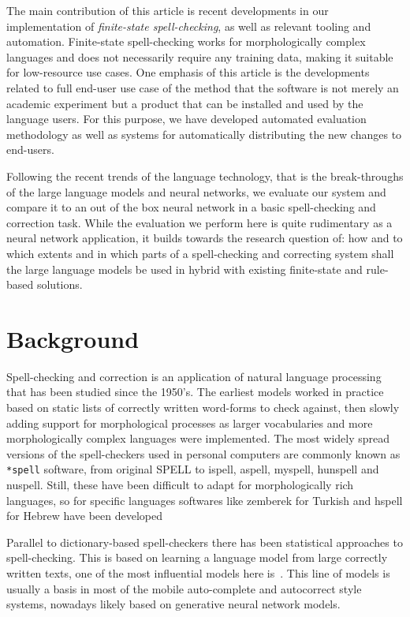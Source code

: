 \documentclass[free]{flammie}
\begin{document}
The main contribution of this article is recent developments in our
implementation of \textit{finite-state spell-checking}, as well as relevant
tooling and automation.  Finite-state spell-checking works for morphologically
complex languages and does not necessarily require any training data, making it
suitable for low-resource use cases.  One emphasis of this article is the
developments related to full end-user use case of the method that the software
is not merely an academic experiment but a product that can be installed and
used by the language users.  For this purpose, we have developed automated
evaluation methodology as well as systems for automatically distributing the new
changes to end-users.

Following the recent trends of the language technology, that is the
break-throughs of the large language models and neural networks, we evaluate our
system and compare it to an out of the box neural network in a basic
spell-checking and correction task. While the evaluation we perform here is
quite rudimentary as a neural network application, it builds towards the
research question of: how and to which extents and in which parts of a
spell-checking and correcting system shall the large language models be used in
hybrid with existing finite-state and rule-based solutions.

\section{Background}

Spell-checking and correction is an application of natural language processing
that has been studied since the 1950's.  The earliest models worked in practice
based on static lists of correctly written word-forms to check against, then
slowly adding support for morphological processes as larger vocabularies and
more morphologically complex languages were implemented.  The most widely spread
versions of the spell-checkers used in personal computers are commonly known as
\texttt{*spell} software, from original SPELL to ispell, aspell, myspell,
hunspell and nuspell.  Still, these have been difficult to adapt for
morphologically rich languages, so for specific languages softwares like
zemberek for Turkish and hspell for Hebrew have been developed

Parallel to dictionary-based spell-checkers there has been statistical
approaches to spell-checking.  This is based on learning a language model from
large correctly written texts, one of the most influential models here
is~\cite{norvig2010howto}.  This line of models is usually a basis in most of
the mobile auto-complete and autocorrect style systems, nowadays likely based on
generative neural network models.
\end{document}
